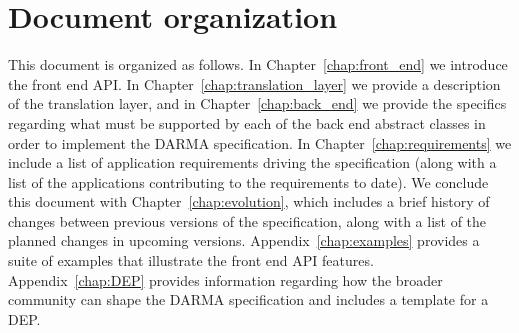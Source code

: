 






\section{Document organization}
\label{sec:organization}
This document is organized as follows.  In Chapter~\ref{chap:front_end} we
introduce the \gls{front end} \gls{API}.  In
Chapter~\ref{chap:translation_layer} we
provide a description of the \gls{translation layer}, and in
Chapter~\ref{chap:back_end} we provide the specifics regarding what must be
supported by each of the \gls{back end} abstract classes in order to implement
the \gls{DARMA} specification. In Chapter~\ref{chap:requirements} we include a list
of application requirements driving the specification (along with a list of the
    applications contributing to the requirements to date).
We conclude this document with
Chapter~\ref{chap:evolution}, which includes a brief history of changes between
previous versions of the specification, along with a list of the planned changes 
in upcoming versions.
Appendix~\ref{chap:examples} provides a suite of examples that illustrate the
 \gls{front end} \gls{API} features. 
Appendix~\ref{chap:DEP} provides information regarding how the broader
community can shape the \gls{DARMA} specification and includes a template for 
a \gls{DEP}. 

